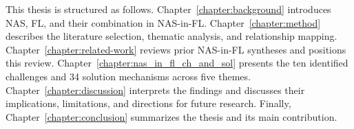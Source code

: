 This thesis is structured as follows. Chapter~\ref{chapter:background} introduces NAS, FL, and their combination in NAS-in-FL. Chapter~\ref{chapter:method} describes the literature selection, thematic analysis, and relationship mapping. Chapter~\ref{chapter:related-work} reviews prior NAS-in-FL syntheses and positions this review. Chapter~\ref{chapter:nas_in_fl_ch_and_sol} presents the ten identified challenges and 34 solution mechanisms across five themes. Chapter~\ref{chapter:discussion} interprets the findings and discusses their implications, limitations, and directions for future research. Finally, Chapter~\ref{chapter:conclusion} summarizes the thesis and its main contribution.
